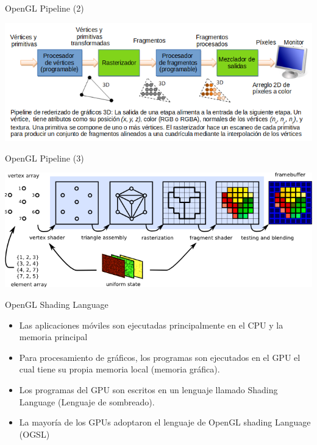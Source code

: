 \documentclass[aspectratio=169,compress]{beamer}
\begin{document}
\begin{frame}{OpenGL Pipeline (2)}
    \begin{center}
    \includegraphics[width=\textwidth]{FigsOpenGL/OpenGL_Pipeline_Espaniol.png}
    \end{center}
\end{frame}


\begin{frame}{OpenGL Pipeline (3)}
    \begin{center}
    \includegraphics[width=\textwidth]{FigsOpenGL/evasgl-graphics-pipeline}
    \end{center}
\end{frame}

\begin{frame}{OpenGL Shading Language}
\begin{itemize}
\item Las aplicaciones móviles son ejecutadas principalmente en el CPU y la memoria principal
\item Para procesamiento de gráficos, los programas son ejecutados en el GPU el cual tiene su propia memoria local (memoria gráfica).
\item Los programas del GPU son escritos en un lenguaje llamado Shading Language (Lenguaje de sombreado). 
\item La mayoría de los GPUs adoptaron el lenguaje de OpenGL shading Language (OGSL)
\end{itemize}
\end{frame}
\end{document}
